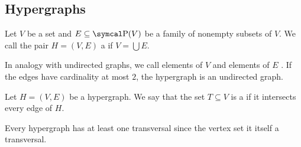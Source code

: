 \subsection{Hypergraphs}\label{subsec:hypergraphs}

\begin{definition}\label{def:hypergraph}\cite[30]{Gondran1984}
  Let \( V \) be a set and \( E \subseteq \Power(V) \) be a family of nonempty subsets of \( V \). We call the pair \( H = (V, E) \) a  if \( V = \bigcup E \).

  In analogy with undirected graphs, we call elements of \( V \)  and elements of \( E \) . If the edges have cardinality at most \( 2 \), the hypergraph is an undirected graph.
\end{definition}

\begin{definition}\label{def:hypergraph_transversal}\cite[32]{Gondran1984}
  Let \( H = (V, E) \) be a hypergraph. We say that the set \( T \subseteq V \) is a  if it intersects every edge of \( H \).
\end{definition}

\begin{example}\label{ex:trivial_hypergraph_transversal}
  Every hypergraph has at least one transversal since the vertex set it itself a transversal.
\end{example}

